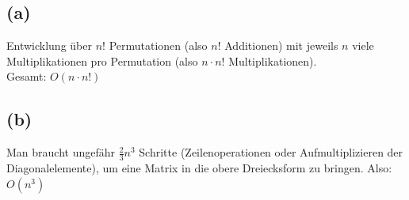 \documentclass{article} %
\begin{document}
\subsection*{(a)}
Entwicklung über $n!$ Permutationen (also  $n!$ Additionen) mit jeweils $n$ viele Multiplikationen pro Permutation (also $n  \cdot n!$ Multiplikationen). \\
Gesamt: $O(n \cdot n!)$

\subsection*{(b)}
Man braucht ungefähr $\frac{2}{3}n^3$ Schritte (Zeilenoperationen oder Aufmultiplizieren der Diagonalelemente), um eine Matrix in die obere Dreiecksform zu bringen. 
Also: $O(n^3)$
\end{document}
